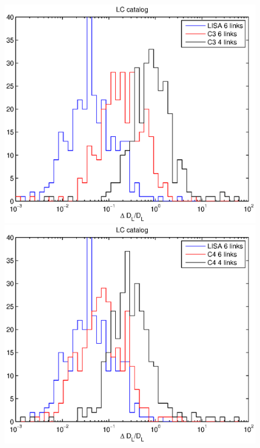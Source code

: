 \documentclass{iopart}
\begin{document}
\begin{figure}[H]
\includegraphics[scale=0.54]{FigSMBHRyanNeil/LCD3.eps}
\includegraphics[scale=0.54]{FigSMBHRyanNeil/LCD4.eps}

\end{figure}
\end{document}
